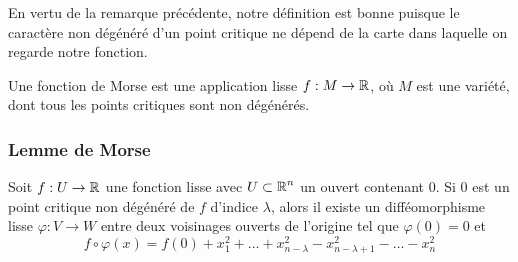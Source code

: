 \begin{remark}
    En vertu de la remarque précédente, notre définition est bonne puisque le caractère
    non dégénéré d'un point critique  ne dépend de la carte dans laquelle on regarde notre
    fonction.
\end{remark}

\begin{defi}
    Une fonction de Morse est une application lisse $f:M\to \operatorname{\mathbb R}$, où $M$ est une variété, 
    dont tous les points critiques sont non dégénérés.
\end{defi}

\subsubsection{Lemme de Morse}
\begin{lem}
    Soit $f:U\to\operatorname{\mathbb R}$ une fonction lisse avec $U\subset\operatorname{\mathbb R}^n$ un ouvert contenant $0$. 
    Si $0$ est un point critique non dégénéré de $f$ d'indice $\lambda$, alors il existe un 
    difféomorphisme lisse $\varphi:V\to W$ entre deux voisinages ouverts de l'origine 
    tel que $\varphi(0)=0$ et 
    \[
        f\circ\varphi(x)=f(0)+x_1^2+\dots+x_{n-\lambda}^2-x_{n-\lambda+1}^2-\dots-x_n^2
    \]
\end{lem}

